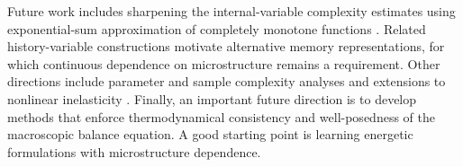 \documentclass[3p, 12pt, preprint]{elsarticle}
\begin{document}
{\color{blue}Future work includes sharpening the internal-variable complexity estimates using exponential-sum approximation of completely monotone functions \cite{kammler1976chebyshev,braess2005approximation,beylkin2010revisited,koyama2023exponential,darrow2026spectral}. Related history-variable constructions \cite{romero2026identification} motivate alternative memory representations, for which continuous dependence on microstructure remains a requirement. Other directions include parameter and sample complexity analyses \cite{lanthaler2026parametric,kovachki2024data} and extensions to nonlinear inelasticity \cite{masi2023evolution,ortiz2026encoding}. Finally, an important future direction is to develop methods that enforce thermodynamical consistency and well-posedness of the macroscopic balance equation. A good starting point is learning energetic formulations \cite{huang2022variational,flaschel2025convex, raj2026neural} with microstructure dependence.}







\end{document}
